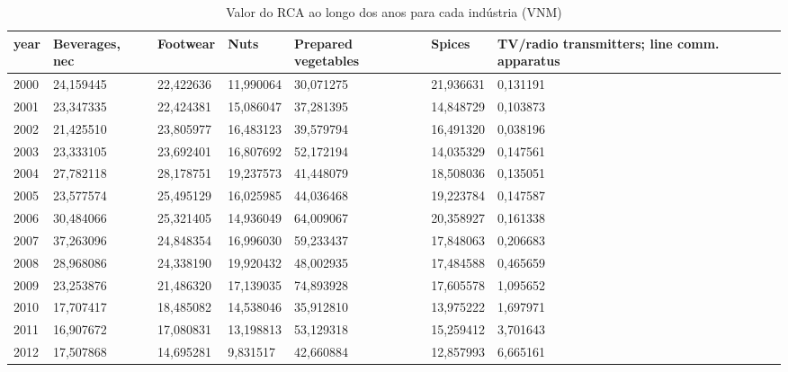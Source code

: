 \begin{table}
\centering
\caption{Valor do RCA ao longo dos anos para cada indústria (VNM)}
\begin{tabular}{p{1cm}p{2cm}p{2cm}p{2cm}p{2cm}p{2cm}p{2cm}}
\toprule
 year &  Beverages, nec &  Footwear &      Nuts &  Prepared vegetables &    Spices &  TV/radio transmitters; line comm. apparatus \\
\midrule
 2000 &       24,159445 & 22,422636 & 11,990064 &            30,071275 & 21,936631 &                                     0,131191 \\
 2001 &       23,347335 & 22,424381 & 15,086047 &            37,281395 & 14,848729 &                                     0,103873 \\
 2002 &       21,425510 & 23,805977 & 16,483123 &            39,579794 & 16,491320 &                                     0,038196 \\
 2003 &       23,333105 & 23,692401 & 16,807692 &            52,172194 & 14,035329 &                                     0,147561 \\
 2004 &       27,782118 & 28,178751 & 19,237573 &            41,448079 & 18,508036 &                                     0,135051 \\
 2005 &       23,577574 & 25,495129 & 16,025985 &            44,036468 & 19,223784 &                                     0,147587 \\
 2006 &       30,484066 & 25,321405 & 14,936049 &            64,009067 & 20,358927 &                                     0,161338 \\
 2007 &       37,263096 & 24,848354 & 16,996030 &            59,233437 & 17,848063 &                                     0,206683 \\
 2008 &       28,968086 & 24,338190 & 19,920432 &            48,002935 & 17,484588 &                                     0,465659 \\
 2009 &       23,253876 & 21,486320 & 17,139035 &            74,893928 & 17,605578 &                                     1,095652 \\
 2010 &       17,707417 & 18,485082 & 14,538046 &            35,912810 & 13,975222 &                                     1,697971 \\
 2011 &       16,907672 & 17,080831 & 13,198813 &            53,129318 & 15,259412 &                                     3,701643 \\
 2012 &       17,507868 & 14,695281 &  9,831517 &            42,660884 & 12,857993 &                                     6,665161 \\

\end{tabular}
\end{table}
